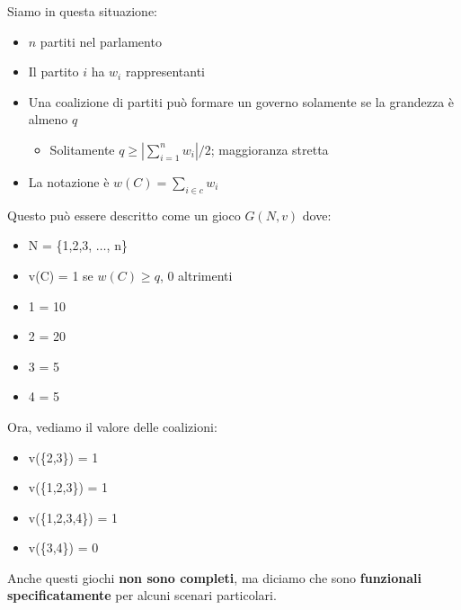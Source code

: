 Siamo in questa situazione:
\begin{itemize}
    \item $n$ partiti nel parlamento
    \item Il partito $i$ ha $w_i$ rappresentanti
    \item Una coalizione di partiti può formare un governo solamente se la grandezza è
          almeno $q$
          \begin{itemize}
              \item Solitamente $q \geq | \sum_{i=1}^n w_i|/2$; maggioranza stretta
          \end{itemize}
    \item La notazione è $w(C) = \sum_{i \in c} w_i$
\end{itemize}

Questo può essere descritto come un gioco $G (N,v)$ dove:
\begin{itemize}
    \item N = \{1,2,3, $\dots$, n\}
    \item v(C) = 1 se $w(C) \geq q$, 0 altrimenti
\end{itemize}

\begin{esempio}
\end{esempio}

\begin{itemize}
    \item 1 = 10
    \item 2 = 20
    \item 3 = 5
    \item 4 = 5
\end{itemize}

Ora, vediamo il valore delle coalizioni:
\begin{itemize}
    \item v(\{2,3\}) = 1
    \item v(\{1,2,3\}) = 1
    \item v(\{1,2,3,4\}) = 1
    \item v(\{3,4\}) = 0
\end{itemize}

Anche questi giochi \textbf{non sono completi}, ma diciamo che sono
\textbf{funzionali specificatamente} per alcuni scenari particolari.

